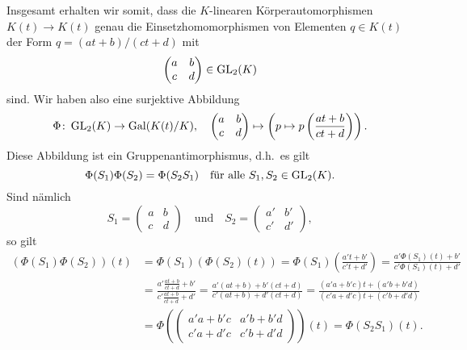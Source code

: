 \documentclass[a4paper,10pt,numbers=noenddot]{scrartcl}
\begin{document}
Insgesamt erhalten wir somit, dass die $K$-linearen Körperautomorphismen $K(t) \to K(t)$ genau die Einsetzhomomorphismen von Elementen $q \in K(t)$ der Form $q = (at+b)/(ct+d)$ mit
\[
  \begin{pmatrix}
    a & b
    \\
    c & d
  \end{pmatrix}
  \in
  \operatorname{GL}_2(K)
\]
sind.
Wir haben also eine surjektive Abbildung
\[
          \Phi
  \colon  \operatorname{GL}_2(K)
  \to     \operatorname{Gal}(K(t) / K),
  \quad
          \begin{pmatrix}
            a & b
            \\
            c & d
          \end{pmatrix}
          \mapsto
          \left(
                    p
            \mapsto p\left( \frac{at+b}{ct+d} \right)
          \right).
\]
Diese Abbildung ist ein Gruppenantimorphismus, d.h.\ es gilt
\[
  \Phi(S_1) \Phi(S_2) = \Phi(S_2 S_1)
  \quad
  \text{für alle $S_1, S_2 \in \operatorname{GL}_2(K)$}.
\]
Sind nämlich
\[
    S_1
  = \begin{pmatrix}
      a & b
      \\
      c & d
    \end{pmatrix}
  \quad
  \text{und}
  \quad
    S_2
  = \begin{pmatrix}
      a'  & b'
      \\
      c'  & d'
    \end{pmatrix},
\]
so gilt
\begin{align*}
      (\Phi(S_1) \Phi(S_2))(t)
  &=  \Phi(S_1)( \Phi(S_2)(t) )
  =   \Phi(S_1)\left( \frac{a' t + b'}{c' t + d'} \right)
  =   \frac{a' \Phi(S_1)(t) + b'}{c' \Phi(S_1 )(t) + d'}
  \\
  &=  \frac{a' \frac{a t + b}{c t + d} + b'}{c' \frac{a t + b}{c t + d} + d'}
  =   \frac{a'(at+b) + b'(ct+d)}{c'(at+b) + d'(ct+d)}
  =   \frac{(a'a + b'c)t + (a'b + b'd)}{(c'a + d'c)t  + (c'b + d'd)}
  \\
  &=  \Phi\left(
            \begin{pmatrix}
              a'a + b'c & a'b + b'd
              \\
              c'a + d'c & c'b + d'd
            \end{pmatrix}
          \right)(t)
  =   \Phi(S_2 S_1)(t).
\end{align*}
\end{document}
